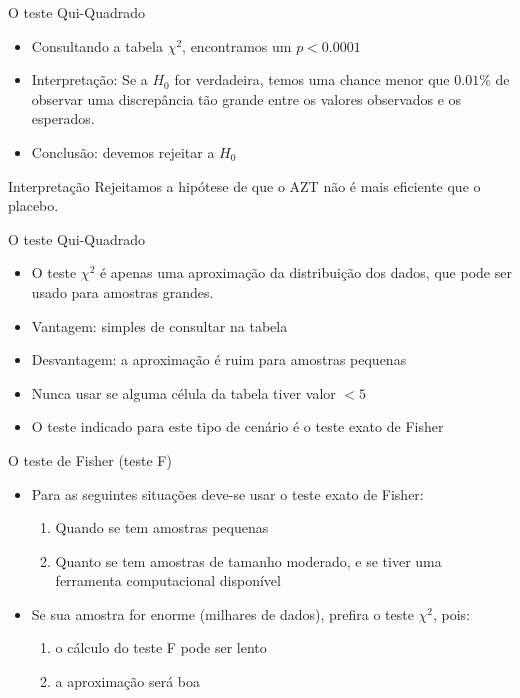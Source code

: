 \documentclass{beamer}
\begin{document}
\begin{frame}{O teste Qui-Quadrado}
  \begin{itemize}
  \item Consultando a tabela $\chi^2$, encontramos um $p<0.0001$
  \item Interpretação: Se a $H_0$ for verdadeira, temos uma
    chance menor que $0.01\%$ de observar uma discrepância tão grande
    entre os valores observados e os esperados.
  \item Conclusão: devemos \alert{rejeitar} a $H_0$
  \end{itemize}
  \begin{block}{Interpretação}
    Rejeitamos a hipótese de que o AZT não é mais eficiente que o
    placebo.
  \end{block}
\end{frame}

\begin{frame}{O teste Qui-Quadrado}
  \begin{itemize}
  \item O teste $\chi^2$ é apenas uma aproximação da distribuição dos
    dados, que pode ser usado para amostras grandes.
  \item Vantagem: simples de consultar na tabela
  \item Desvantagem: a aproximação é ruim para amostras pequenas
  \item Nunca usar se alguma célula da tabela tiver valor \alert{$<5$}
  \item O teste indicado para este tipo de cenário é o \alert{teste
      exato de Fisher}
  \end{itemize}
\end{frame}

\begin{frame}{O teste de Fisher (teste F)}
  \begin{itemize}
  \item Para as seguintes situações deve-se usar o teste exato de
    Fisher:
    \begin{enumerate}
    \item Quando se tem amostras pequenas
    \item Quanto se tem amostras de tamanho moderado, e se tiver uma
      ferramenta computacional disponível
    \end{enumerate}
  \item Se sua amostra for enorme (milhares de dados), prefira o teste
    $\chi^2$, pois:
    \begin{enumerate}
    \item o cálculo do teste F pode ser lento
    \item a aproximação será boa
    \end{enumerate}
  \end{itemize}
\end{frame}
\end{document}
